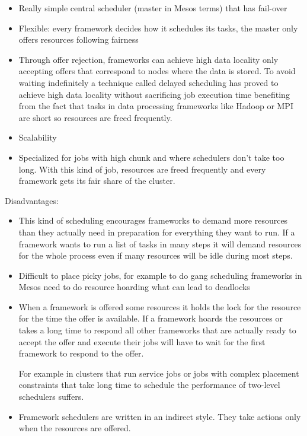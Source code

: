 \documentclass{svjour3}                     %
\begin{document}
\begin{itemize}
  \item
  Really simple central scheduler (master in Mesos terms) that has
  fail-over 
 \item
  Flexible: every framework decides how it schedules its tasks, the
  master only offers resources following fairness 
 \item
  Through offer rejection, frameworks can achieve high data locality
  only accepting offers that correspond to nodes where the data is
  stored. To avoid waiting indefinitely a technique called delayed
  scheduling \cite{zaharia_delay_2010} has proved to achieve high data locality without
  sacrificing job execution time benefiting from the fact that tasks in
  data processing frameworks like Hadoop or MPI are short so resources
  are freed frequently.
 \item Scalability
 \item Specialized for jobs with high chunk and where schedulers don't take
too long. With this kind of job, resources are freed frequently and
every framework gets its fair share of the cluster.
\end{itemize}

Disadvantages:

\begin{itemize}
 \item This kind of scheduling encourages frameworks to demand more
   resources than they actually need in preparation for everything
   they want to run. If a framework wants to run a list of tasks in
   many steps it will demand resources for the whole process even if
   many resources will be idle during most steps.
 \item Difficult to place picky jobs, for example to do gang scheduling
frameworks in Mesos need to do resource hoarding what can lead to
deadlocks
 \item When a framework is offered some resources it
holds the lock for the resource for the time the offer is
available. If a framework hoards the resources or takes a long
time to respond all other frameworks that are actually ready to accept
the offer and execute their jobs will have to wait for the first
framework to respond to the offer.

For example in clusters that run service jobs or jobs with complex
placement constraints that take long time to schedule the performance
of two-level schedulers suffers.

 \item Framework schedulers are written in an indirect style. They
  take actions only when the resources are offered. 
\end{itemize}
\end{document}
